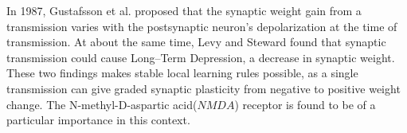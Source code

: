 	In 1987, Gustafsson et al. proposed that the synaptic weight gain from a transmission varies with the postsynaptic neuron's depolarization at the time of transmission\cite{Gustafsson03011987}. %
	At about the same time, Levy and Steward found that synaptic transmission could cause Long--Term Depression, a decrease in synaptic weight\cite{Levy1983791LTDetterSTDP}. %
	These two findings makes stable local learning rules possible, as a single transmission can give graded synaptic plasticity from negative to positive weight change\cite{CITE}.
	The N-methyl-D-aspartic acid($NMDA$) receptor is found to be of a particular importance in this context.

